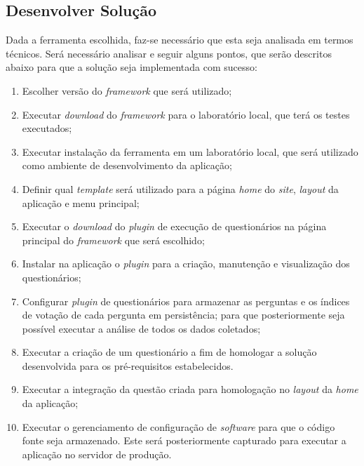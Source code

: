 %
\subsection{Desenvolver Solução}
\label{sub:definir_tecnologia}

Dada a ferramenta escolhida, faz-se necessário que esta seja analisada em termos técnicos. Será necessário analisar e seguir alguns pontos, que
serão descritos abaixo para que a solução seja implementada com sucesso:

\begin{enumerate}
    \item Escolher versão do \textit{framework} que será utilizado;
    \item Executar \textit{download} do \textit{framework} para o laboratório local, que terá os testes executados;
    \item Executar instalação da ferramenta em um laboratório local, que será utilizado como ambiente de
        desenvolvimento da aplicação;
    \item Definir qual \textit{template} será utilizado para a página \textit{home} do \textit{site}, \textit{layout} da aplicação e menu principal;
    \item Executar o \textit{download} do \textit{plugin} de execução de questionários na página principal do \textit{framework} que será escolhido;
    \item Instalar na aplicação o \textit{plugin} para a criação, manutenção e visualização dos questionários;
    \item Configurar \textit{plugin} de questionários para armazenar as perguntas e os índices de votação de cada pergunta em persistência;
        para que posteriormente seja possível executar a análise de todos os dados coletados;
    \item Executar a criação de um questionário a fim de homologar a solução desenvolvida para os pré-requisitos estabelecidos. 
    \item Executar a integração da questão criada para homologação no \textit{layout} da \textit{home} da aplicação;
    \item Executar o gerenciamento de configuração de \textit{software} para que o código fonte seja armazenado. Este será posteriormente
        capturado para executar a aplicação no servidor de produção.
\end{enumerate}

